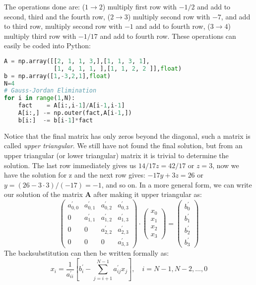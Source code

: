 \documentclass[graybox,sectrefs,envcountresetchap,open=right,final]{svmonodo}
\begin{document}
The operations done are: ($1\to2$) multiply first row with $-1/2$ and add to second, third and the fourth row, ($2\to 3$) multiply second row with $-7$, and add to third row, multiply second row with $-1$ and add to fourth row, ($3\to4$) multiply third row with $-1/17$ and add to fourth row. These operations can easily be coded into Python:
\begin{lstlisting}[language=Python,style=blue1]
A = np.array([[2, 1, 1, 3,],[1, 1, 3, 1],
              [1, 4, 1, 1, ],[1, 1, 2, 2 ]],float)
b = np.array([1,-3,2,1],float)
N=4
# Gauss-Jordan Elimination
for i in range(1,N):
    fact    = A[i:,i-1]/A[i-1,i-1]
    A[i:,] -= np.outer(fact,A[i-1,])
    b[i:]  -= b[i-1]*fact
\end{lstlisting}
Notice that the final matrix has only zeros beyond the diagonal, such a matrix is called \emph{upper triangular}. We still have not found the final solution, but from an upper triangular (or lower triangular) matrix it is trivial to determine the solution. The last row immediately gives us $14/17z=42/17$ or $z=3$, now we have the solution for z and the next row gives: $-17y+3z=26$ or $y=(26-3\cdot3)/(-17)=-1$, and so on. In a more general form, we can write our solution of the matrix $\mathbf{A}$ after making it upper triangular as:
\begin{equation}
\begin{pmatrix}
a^\prime_{0,0}&a^\prime_{0,1}&a^\prime_{0,2}&a^\prime_{0,3}\\ 
0&a^\prime_{1,1}&a^\prime_{1,2}&a^\prime_{1,3}\\ 
0&0&a^\prime_{2,2}&a^\prime_{2,3}\\ 
0&0&0&a^\prime_{3,3}
\end{pmatrix}
\cdot
\begin{pmatrix}
x_0\\ 
x_1\\ 
x_2\\ 
x_3
\end{pmatrix}
=
\begin{pmatrix}
b^\prime_{0}\\ 
b^\prime_{1}\\ 
b^\prime_{2}\\ 
b^\prime_{3}
\end{pmatrix}
\label{eq:nlin:back}
\end{equation}
The backsubstitution can then be written formally as:
\begin{equation}
x_i=\frac{1}{a^\prime_{ii}}\left[b_i^\prime-\sum_{j=i+1}^{N-1}a^\prime_{ij}x_j\right],\quad i=N-1,N-2,\ldots,0
\label{eq:nlin:back2}
\end{equation}
\end{document}
